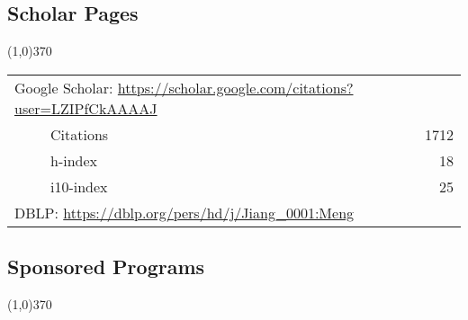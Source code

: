 \documentclass[10pt]{article}
\begin{document}
\vspace{-0.6cm}
\subsection{\sc Scholar Pages}
\vspace{-0.4cm} \line(1,0){370} \vspace{-0.1cm}

\begin{table}[h!]
\begin{tabular*}{12.7cm}{p{11.65cm}r}
\multicolumn{2}{l}{Google Scholar: \url{https://scholar.google.com/citations?user=LZIPfCkAAAAJ}} \\
~~~~~Citations&1712 \\
~~~~~h-index&18 \\
~~~~~i10-index&25 \\
\multicolumn{2}{l}{DBLP: \url{https://dblp.org/pers/hd/j/Jiang\_0001:Meng}} \\
\end{tabular*}
\end{table}

\subsection{\sc Sponsored Programs}
\vspace{-0.4cm} \line(1,0){370} \vspace{-0.1cm}
\end{document}
